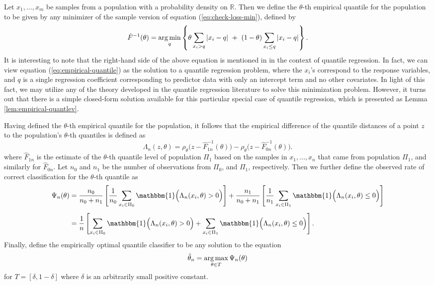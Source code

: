 Let $x_1, \dots, x_m$ be samples from a population with a probability density on
$\mathbb{R}$.  Then we define the $\theta$-th empirical quantile for the
population to be given by any minimizer of the sample version of equation
(\ref{eq:check-loss-min}), defined by
\begin{equation}
  \label{eq:empirical-quantile}
  \hat{F}^{-1} (\theta) = \operatorname*{arg\,min}_q \left\{
    \theta \sum_{ x_{i} > q } |x_{i} - q| ~+~
    (1 - \theta) \sum_{ x_{i} \leq q } |x_{i} - q|
  \right\}.
\end{equation}
It is interesting to note that the right-hand side of the above equation is
mentioned in \cite{koenker1978} in the context of quantile regression.  In
fact, we can view equation (\ref{eq:empirical-quantile}) as the solution to a
quantile regression problem, where the $x_i$'s correspond to the response
variables, and $q$ is a single regression coefficient corresponding to predictor
data with only an intercept term and no other covariates.  In light of this
fact, we may utilize any of the theory developed in the quantile regression
literature to solve this minimization problem.  However, it turns out that there
is a simple closed-form solution available for this particular special case of
quantile regression, which is presented as Lemma \ref{lem:empirical-quantlev}.

Having defined the $\theta$-th empirical quantile for the population, it follows
that the empirical difference of the quantile distances of a point $z$ to the
population's $\theta$-th quantiles is defined as
\[
  \Lambda_n (z, \theta) = \rho_{\theta}\Big(z - \hat{F}_{1n}^{-1}(\theta)\Big) -
  \rho_{\theta}\Big(z - \hat{F}_{0n}^{-1}(\theta)\Big).
\]
where $\hat{F}_{1n}$ is the estimate of the $\theta$-th quantile level of
population $\Pi_1$ based on the samples in $x_1, \dots, x_n$ that came from
population $\Pi_1$, and similarly for $\hat{F}_{0n}$.  Let $n_0$ and $n_1$
be the number of observations from $\Pi_0$, and $\Pi_1$, respectively.  Then we
further define the observed rate of correct classification for the $\theta$-th
quantile as
\begin{align}
  \begin{split}
    \Psi_n(\theta)
    &= \frac{n_0}{n_0 + n_1} \left[
      \frac{1}{n_0} \sum_{x_i \in \Pi_0}
      \mathbbm{1}\Big( \Lambda_n(x_i, \theta) > 0 \Big)
    \right] +
      \frac{n_1}{n_0 + n_1} \left[
        \frac{1}{n_1} \sum_{x_i \in \Pi_1}
        \mathbbm{1}\Big( \Lambda_n(x_i, \theta) \leq 0 \Big)
      \right] \\[1ex]
    &= \frac{1}{n} \left[
      \sum_{x_i \in \Pi_0} \mathbbm{1}\Big( \Lambda_n(x_i, \theta) > 0 \Big) +
      \sum_{x_i \in \Pi_1} \mathbbm{1}\Big( \Lambda_n(x_i, \theta) \leq 0 \Big)
    \right].
  \end{split}
\end{align}
Finally, define the empirically optimal quantile classifier to be any solution
to the equation
\begin{equation}
  \hat{\theta}_n = \operatorname*{arg\,max}_{\theta \in T} \Psi_n(\theta)
\end{equation}
for $T = [ \delta, 1 - \delta]$ where $\delta$ is an arbitrarily small positive
constant.



